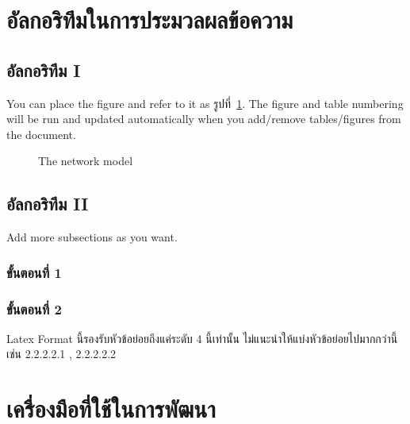 \documentclass[12pt,oneside,openright,a4paper]{cpe-thai-project}
\begin{document}
\section{อัลกอริทึมในการประมวลผลข้อความ}
\subsection{อัลกอริทึม I}

You can place the figure and refer to it as รูปที่~\ref{fig:model2}.
The figure and table numbering will be run and updated automatically when you add/remove tables/figures from the document.

\begin{figure}[!h]\centering
  \setlength{\fboxrule}{0.2mm} %
  \setlength{\fboxsep}{1cm}
  \caption{The network model}\label{fig:model2}
\end{figure}


\subsection{อัลกอริทึม II}
Add more subsections as you want.
\subsubsection{ขั้นตอนที่ 1}
\subsubsection{ขั้นตอนที่ 2}
Latex Format นี้รองรับหัวข้อย่อยถึงแค่ระดับ 4 นี้เท่านั้น ไม่แนะนำให้แบ่งหัวข้อย่อยไปมากกว่านี้ เช่น 2.2.2.2.1 , 2.2.2.2.2

\section{เครื่องมือที่ใช้ในการพัฒนา}

\end{document}
